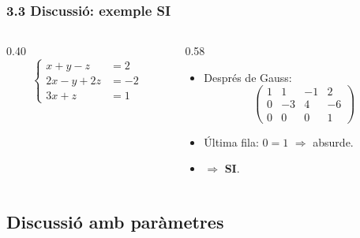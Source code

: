 \documentclass[aspectratio=169]{beamer}
\newcommand{\textverd}[1]{{\color{margueVerdFosc}#1}}
\begin{document}
\begin{frame}[t]
  \frametitle{3.3 Discussió: exemple SI}

  \vspace{-0.3cm}
  \begin{columns}[T,onlytextwidth]
    \begin{column}{0.40\textwidth}
      \[
        \left\{\begin{aligned}
          x + y - z &= 2 \\
          2x - y + 2z &= -2 \\
          3x + z &= 1
        \end{aligned}\right.
      \]
    \end{column}
    \begin{column}{0.58\textwidth}
      \begin{itemize}
        \item<1-> Després de Gauss:
          \[
            \left(\begin{array}{ccc|c}
              1 & 1 & -1 & 2 \\
              0 & -3 & 4 & -6 \\
              0 & 0 & 0 & 1
            \end{array}\right)
          \]
        \item<2-> Última fila: $0=1$ \;$\Rightarrow$\; absurde.
        \item<3-> \;$\Rightarrow$\; \textverd{\textbf{SI}}.
      \end{itemize}
    \end{column}
  \end{columns}
\end{frame}

\subsection{Discussió amb paràmetres}
\end{document}
